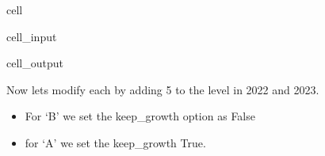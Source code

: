 \documentclass[letterpaper,10pt,english]{jupyterBook}
\begin{document}
\begin{sphinxuseclass}{cell}\begin{sphinxVerbatimInput}

\begin{sphinxuseclass}{cell_input}
\begin{sphinxVerbatim}[commandchars=\\\{\}]
\PYG{p}{[}\PYG{p}{[}\PYG{p}{]}\PYG{p}{]}
\end{sphinxVerbatim}

\end{sphinxuseclass}\end{sphinxVerbatimInput}
\begin{sphinxVerbatimOutput}

\begin{sphinxuseclass}{cell_output}
\noindent{}

\end{sphinxuseclass}\end{sphinxVerbatimOutput}

\end{sphinxuseclass}
\sphinxAtStartPar
Now lets modify each by adding 5 to the level in 2022 and 2023.
\begin{itemize}
\item {} 
\sphinxAtStartPar
For ‘B’ we set the keep\_growth option as False

\item {} 
\sphinxAtStartPar
for ‘A’ we set the keep\_growth True.

\end{itemize}
\end{document}
